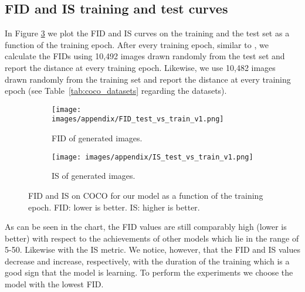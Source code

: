 \documentclass[a4paper,12pt]{report}
\begin{document}
\subsection{FID and IS training and test curves}\label{sec:train_vs_test_FID}
In Figure \ref{fig:fid_is_metrics} we plot the FID and IS curves on the training and the test set as a function of the training epoch. After every training epoch, similar to \cite{StyleGAN}, we calculate the FIDs using 10,492 images drawn randomly from the test set and report the distance at every training epoch. Likewise, we use 10,482 images drawn randomly from the training set and report the distance at every training epoch (see Table~\ref{tab:coco_datasets} regarding the datasets). 
\begin{figure}[h]
\centering
\begin{subfigure}{0.49\textwidth}
\texttt{[image: images/appendix/FID\_test\_vs\_train\_v1.png]}
\caption{FID of generated images.}
\label{fig:fid_test_train}
\end{subfigure}
\begin{subfigure}{0.49\textwidth}
\texttt{[image: images/appendix/IS\_test\_vs\_train\_v1.png]}
\caption{IS of generated images.}
\label{fig:is_test_train}
\end{subfigure}
\caption{FID and IS on COCO for our model as a function of the training epoch. FID: lower is better. IS: higher is better.}
\label{fig:fid_is_metrics}
\end{figure}
As can be seen in the chart, the FID values are still comparably high (lower is better) with respect to the achievements of other models which lie in the range of 5-50. Likewise with the IS metric. We notice, however, that the FID and IS values decrease and increase, respectively, with the duration of the training which is a good sign that the model is learning. To perform the experiments we choose the model with the lowest FID.



\end{document}
